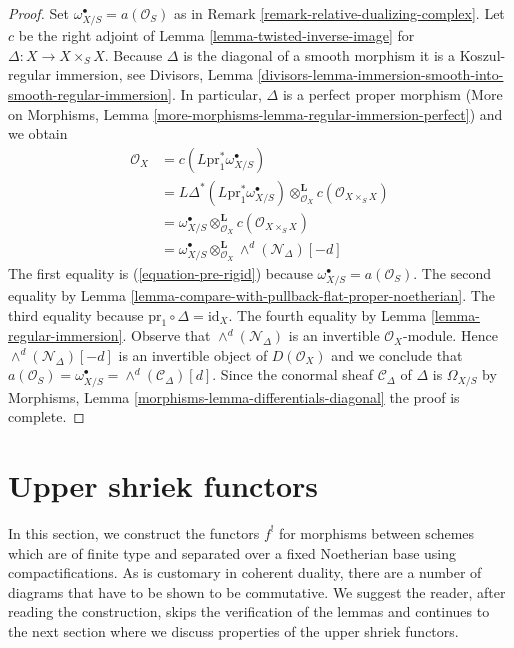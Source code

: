 \documentclass{stacks-project}
\theoremstyle{plain}
\theoremstyle{definition}
\theoremstyle{remark}
\numberwithin{equation}{subsection}
\begin{document}
\begin{proof}
Set $\omega_{X/S}^\bullet = a(\mathcal{O}_S)$ as in
Remark \ref{remark-relative-dualizing-complex}.
Let $c$ be the right adjoint of Lemma \ref{lemma-twisted-inverse-image} for
$\Delta : X \to X \times_S X$. Because $\Delta$
is the diagonal of a smooth morphism it is a
Koszul-regular immersion, see Divisors, Lemma
\ref{divisors-lemma-immersion-smooth-into-smooth-regular-immersion}.
In particular, $\Delta$ is a perfect proper morphism
(More on Morphisms, Lemma \ref{more-morphisms-lemma-regular-immersion-perfect})
and we obtain
\begin{align*}
\mathcal{O}_X
& =
c(L\text{pr}_1^*\omega_{X/S}^\bullet) \\
& =
L\Delta^*(L\text{pr}_1^*\omega_{X/S}^\bullet)
\otimes_{\mathcal{O}_X}^\mathbf{L}
c(\mathcal{O}_{X \times_S X}) \\
& =
\omega_{X/S}^\bullet \otimes_{\mathcal{O}_X}^\mathbf{L}
c(\mathcal{O}_{X \times_S X}) \\
& =
\omega_{X/S}^\bullet
\otimes_{\mathcal{O}_X}^\mathbf{L}
\wedge^d(\mathcal{N}_\Delta)[-d]
\end{align*}
The first equality is (\ref{equation-pre-rigid}) because
$\omega_{X/S}^\bullet = a(\mathcal{O}_S)$. The second equality by
Lemma \ref{lemma-compare-with-pullback-flat-proper-noetherian}.
The third equality because $\text{pr}_1 \circ \Delta = \text{id}_X$.
The fourth equality by Lemma \ref{lemma-regular-immersion}.
Observe that $\wedge^d(\mathcal{N}_\Delta)$ is an invertible
$\mathcal{O}_X$-module. Hence $\wedge^d(\mathcal{N}_\Delta)[-d]$
is an invertible object of $D(\mathcal{O}_X)$ and we conclude that
$a(\mathcal{O}_S) = \omega_{X/S}^\bullet = \wedge^d(\mathcal{C}_\Delta)[d]$.
Since the conormal sheaf $\mathcal{C}_\Delta$ of $\Delta$ is
$\Omega_{X/S}$ by
Morphisms, Lemma \ref{morphisms-lemma-differentials-diagonal}
the proof is complete.
\end{proof}







\section{Upper shriek functors}
\label{section-upper-shriek}

\noindent
In this section, we construct the functors $f^!$ for morphisms
between schemes which are of finite type and separated
over a fixed Noetherian base using compactifications.
As is customary in coherent duality, there are a number of diagrams
that have to be shown to be commutative. We suggest the reader,
after reading the construction, skips the verification of the
lemmas and continues to the next section where we discuss
properties of the upper shriek functors.
\end{document}
